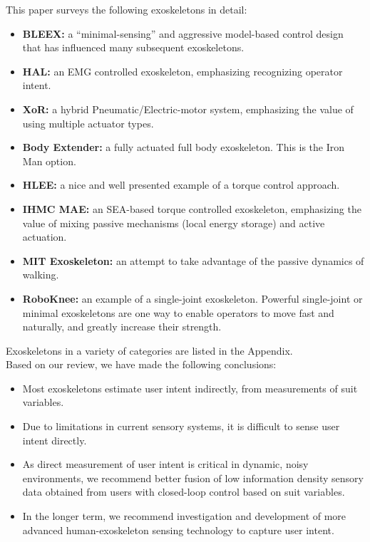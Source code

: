 \documentclass[letterpaper,12pt,fullpage]{article}
\begin{document}
This paper surveys the following exoskeletons in detail:
\begin{itemize}
\item
{\bf BLEEX:} a ``minimal-sensing'' and aggressive model-based control design that has influenced many subsequent exoskeletons.
\item
{\bf HAL:} an EMG controlled exoskeleton, emphasizing recognizing operator intent.
\item
{\bf XoR:} a hybrid Pneumatic/Electric-motor system, emphasizing the
value of using multiple actuator types.
\item
{\bf Body Extender:} a fully actuated full body exoskeleton. This is the
Iron Man option.
\item
{\bf HLEE:} a nice and well presented example of a torque control approach.
\item
{\bf IHMC MAE:} an SEA-based torque controlled exoskeleton, emphasizing
the value of mixing passive mechanisms (local energy storage) and active
actuation.
\item
{\bf MIT Exoskeleton:} an attempt to take advantage of the passive dynamics
of walking.
\item
{\bf RoboKnee:} an example of a single-joint exoskeleton. Powerful single-joint
or minimal exoskeletons are one way to enable operators to move fast
and naturally, and greatly increase their strength.
\end{itemize}

\noindent Exoskeletons in a variety of categories are listed in the Appendix.\\

\noindent Based on our review, we have made the following conclusions:
\begin{itemize}
\item Most exoskeletons estimate user intent indirectly, from measurements of suit variables.
\item Due to limitations in current sensory systems, it is difficult to sense user intent directly. 
\item As direct measurement of user intent is critical in dynamic, noisy environments, we recommend better fusion of low information density sensory data obtained from users with closed-loop control based on suit variables.
\item In the longer term, we recommend investigation and development of more advanced human-exoskeleton sensing technology to capture user intent.
\end{itemize}
\end{document}
